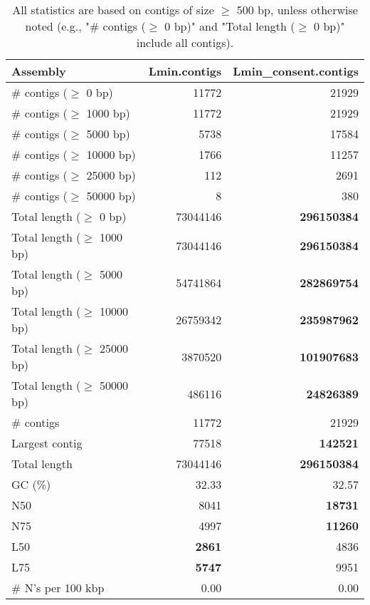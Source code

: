 \documentclass[12pt,a4paper]{article}
\begin{document}
\begin{table}[ht]
\begin{center}
\caption{All statistics are based on contigs of size $\geq$ 500 bp, unless otherwise noted (e.g., "\# contigs ($\geq$ 0 bp)" and "Total length ($\geq$ 0 bp)" include all contigs).}
\begin{tabular}{|l*{2}{|r}|}
\hline
Assembly & Lmin.contigs & Lmin\_consent.contigs \\ \hline
\# contigs ($\geq$ 0 bp) & 11772 & 21929 \\ \hline
\# contigs ($\geq$ 1000 bp) & 11772 & 21929 \\ \hline
\# contigs ($\geq$ 5000 bp) & 5738 & 17584 \\ \hline
\# contigs ($\geq$ 10000 bp) & 1766 & 11257 \\ \hline
\# contigs ($\geq$ 25000 bp) & 112 & 2691 \\ \hline
\# contigs ($\geq$ 50000 bp) & 8 & 380 \\ \hline
Total length ($\geq$ 0 bp) & 73044146 & {\bf 296150384} \\ \hline
Total length ($\geq$ 1000 bp) & 73044146 & {\bf 296150384} \\ \hline
Total length ($\geq$ 5000 bp) & 54741864 & {\bf 282869754} \\ \hline
Total length ($\geq$ 10000 bp) & 26759342 & {\bf 235987962} \\ \hline
Total length ($\geq$ 25000 bp) & 3870520 & {\bf 101907683} \\ \hline
Total length ($\geq$ 50000 bp) & 486116 & {\bf 24826389} \\ \hline
\# contigs & 11772 & 21929 \\ \hline
Largest contig & 77518 & {\bf 142521} \\ \hline
Total length & 73044146 & {\bf 296150384} \\ \hline
GC (\%) & 32.33 & 32.57 \\ \hline
N50 & 8041 & {\bf 18731} \\ \hline
N75 & 4997 & {\bf 11260} \\ \hline
L50 & {\bf 2861} & 4836 \\ \hline
L75 & {\bf 5747} & 9951 \\ \hline
\# N's per 100 kbp & 0.00 & 0.00 \\ \hline
\end{tabular}
\end{center}
\end{table}
\end{document}
